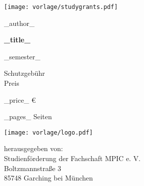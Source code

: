\documentclass[a4paper]{article}
\begin{document}
\ifstudygrants
    \begin{flushright}
    \texttt{[image: vorlage/studygrants.pdf]}
    \end{flushright}
\fi

\begin{center}\sffamily

\huge _author_

\vfill

\Huge \textbf{_title_}\\

\vfill

\LARGE _semester_

\vfill

\ifstudygrants
\Huge Schutzgebühr \\
\else
\Huge Preis \\
\fi

\Huge _price_ \euro

\vfill
_pages_ Seiten

\vfill
\texttt{[image: vorlage/logo.pdf]}

\vfill
\large
herausgegeben von: \\
Studienförderung der Fachschaft MPIC e. V. \\
Boltzmannstraße 3 \\
85748 Garching bei München

\vfill
\,\hfill{}\hfill\,
\vfill
\end{center}
\end{document}

